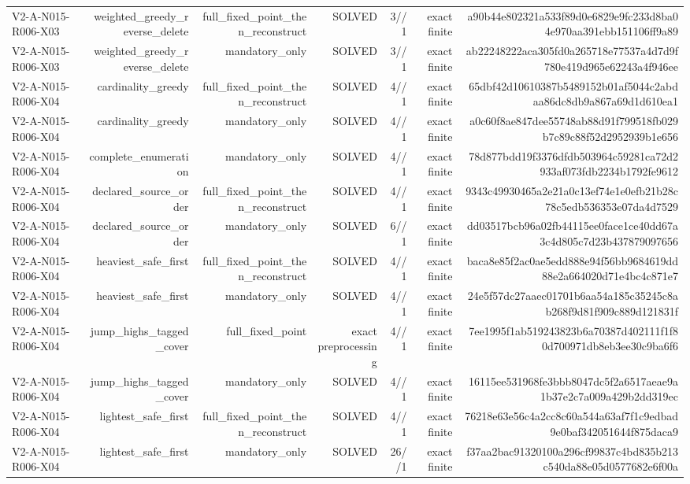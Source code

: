 {\begin{longtable}{lrrrrrr}
V2-A-N015-R006-X03 & weighted\_greedy\_reverse\_delete & full\_fixed\_point\_then\_reconstruct & SOLVED & 3//1 & exact finite & a90b44e802321a533f89d0e6829e9fc233d8ba04e970aa391ebb151106ff9a89 \\
V2-A-N015-R006-X03 & weighted\_greedy\_reverse\_delete & mandatory\_only & SOLVED & 3//1 & exact finite & ab22248222aca305fd0a265718e77537a4d7d9f780e419d965e62243a4f946ee \\
V2-A-N015-R006-X04 & cardinality\_greedy & full\_fixed\_point\_then\_reconstruct & SOLVED & 4//1 & exact finite & 65dbf42d10610387b5489152b01af5044c2abdaa86dc8db9a867a69d1d610ea1 \\
V2-A-N015-R006-X04 & cardinality\_greedy & mandatory\_only & SOLVED & 4//1 & exact finite & a0c60f8ae847dee55748ab88d91f799518fb029b7c89c88f52d2952939b1e656 \\
V2-A-N015-R006-X04 & complete\_enumeration & mandatory\_only & SOLVED & 4//1 & exact finite & 78d877bdd19f3376dfdb503964c59281ca72d2933af073fdb2234b1792fe9612 \\
V2-A-N015-R006-X04 & declared\_source\_order & full\_fixed\_point\_then\_reconstruct & SOLVED & 4//1 & exact finite & 9343c49930465a2e21a0c13ef74e1e0efb21b28c78c5edb536353e07da4d7529 \\
V2-A-N015-R006-X04 & declared\_source\_order & mandatory\_only & SOLVED & 6//1 & exact finite & dd03517bcb96a02fb44115ee0face1ce40dd67a3c4d805c7d23b437879097656 \\
V2-A-N015-R006-X04 & heaviest\_safe\_first & full\_fixed\_point\_then\_reconstruct & SOLVED & 4//1 & exact finite & baca8e85f2ac0ae5edd888e94f56bb9684619dd88e2a664020d71e4bc4c871e7 \\
V2-A-N015-R006-X04 & heaviest\_safe\_first & mandatory\_only & SOLVED & 4//1 & exact finite & 24e5f57dc27aaec01701b6aa54a185c35245c8ab268f9d81f909c889d121831f \\
V2-A-N015-R006-X04 & jump\_highs\_tagged\_cover & full\_fixed\_point & exact preprocessing & 4//1 & exact finite & 7ee1995f1ab519243823b6a70387d402111f1f80d700971db8eb3ee30c9ba6f6 \\
V2-A-N015-R006-X04 & jump\_highs\_tagged\_cover & mandatory\_only & SOLVED & 4//1 & exact finite & 16115ee531968fe3bbb8047dc5f2a6517aeae9a1b37e2c7a009a429b2dd319ec \\
V2-A-N015-R006-X04 & lightest\_safe\_first & full\_fixed\_point\_then\_reconstruct & SOLVED & 4//1 & exact finite & 76218e63e56c4a2cc8c60a544a63af7f1c9edbad9e0baf342051644f875daca9 \\
V2-A-N015-R006-X04 & lightest\_safe\_first & mandatory\_only & SOLVED & 26//1 & exact finite & f37aa2bac91320100a296cf99837c4bd835b213c540da88e05d0577682e6f00a \\

\end{longtable}}
